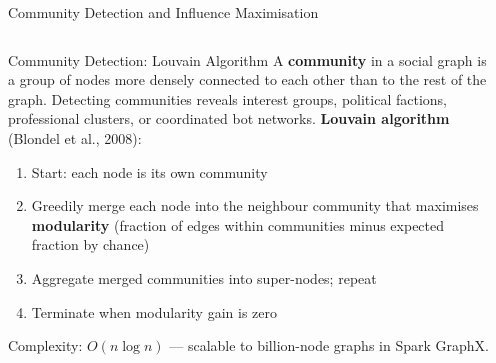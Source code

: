 \documentclass[aspectratio=169,10pt]{beamer}
\begin{document}
\begin{frame}{Community Detection and Influence Maximisation}
  \begin{columns}[T]
      \begin{block}{Community Detection: Louvain Algorithm}
        A \textbf{community} in a social graph is a group of nodes more densely connected to each other than to the rest of the graph.  Detecting communities reveals interest groups, political factions, professional clusters, or coordinated bot networks.
        \vspace{4pt}
        \textbf{Louvain algorithm} (Blondel et al., 2008):
        \begin{enumerate}
          \item Start: each node is its own community
          \item Greedily merge each node into the neighbour community that maximises \textbf{modularity} (fraction of edges within communities minus expected fraction by chance)
          \item Aggregate merged communities into super-nodes; repeat
          \item Terminate when modularity gain is zero
        \end{enumerate}
        Complexity: $O(n \log n)$ --- scalable to billion-node graphs in Spark GraphX.
      \end{block}

      \begin{center}
\end{center}
\end{columns}
\end{frame}
\end{document}

